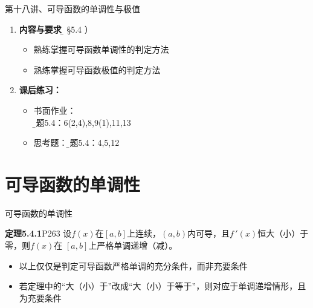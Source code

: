 \begin{frame}{第十八讲、可导函数的单调性与极值}
	\linespread{1.5}
	\begin{enumerate}
	  \item {\bf 内容与要求}{\b（ \S 5.4 ）}
	  \begin{itemize}
	    \item 熟练掌握可导函数单调性的判定方法
	    \item 熟练掌握可导函数极值的判定方法
	  \vspace{1em}
	  \end{itemize}
	  \item {\bf 课后练习：}
	  \begin{itemize}
	    \item 书面作业：\\ {\b 习题5.4：6(2,4),8,9(1),11,13}
 	    \item 思考题：{\b 习题5.4：4,5,12}
	  \end{itemize}
	\end{enumerate}
\end{frame}

\section{可导函数的单调性}

\begin{frame}{可导函数的单调性}
	\linespread{1.2}\pause 
	\begin{block}{{\bf 定理5.4.1}\hfill P263}
		设$f(x)$在$[a,b]$上连续，$(a,b)$内可导，且$f\,'(x)$恒大（小）于零，则$f(x)$在
		$[a,b]$上严格单调递增（减）。
	\end{block} \pause
	\begin{itemize}
	  \item {以上仅仅是判定可导函数严格单调的充分条件，而非充要条件}\pause 
	  \item {若定理中的“大（小）于”改成“大（小）于等于”，则对应于单调递增情形，且为充要条件}
	\end{itemize}
\end{frame}

